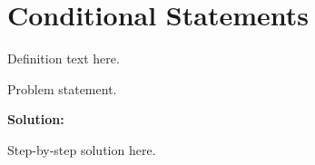 \section{Conditional Statements}


\begin{definition}[Term]
Definition text here.
\end{definition}

\begin{example}
Problem statement.

\textbf{Solution:}

Step-by-step solution here.
\end{example}
